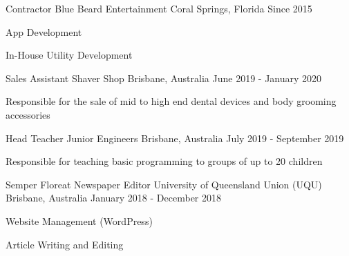 


\begin{cventries}

\cventry
{Contractor} %
{Blue Beard Entertainment} %
{Coral Springs, Florida} %
{Since 2015} %
{ %
\begin{cvitems}
\item {App Development}
\item {In-House Utility Development}
\end{cvitems}
}



\cventry
{Sales Assistant} %
{Shaver Shop} %
{Brisbane, Australia} %
{June 2019 - January 2020} %
{ %
\begin{cvitems}
\item {Responsible for the sale of mid to high end dental devices and body grooming accessories}
\end{cvitems}
}


\cventry
{Head Teacher} %
{Junior Engineers} %
{Brisbane, Australia} %
{July 2019 - September 2019} %
{ %
\begin{cvitems}
\item {Responsible for teaching basic programming to groups of up to 20 children}
\end{cvitems}
}


\cventry
{Semper Floreat Newspaper Editor} %
{University of Queensland Union (UQU)} %
{Brisbane, Australia} %
{January 2018 - December 2018} %
{ %
\begin{cvitems}
\item {Website Management (WordPress)}
\item {Article Writing and Editing}
\end{cvitems}
}


\end{cventries}
